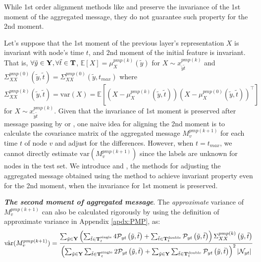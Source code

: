 While 1st order alignment methods like \PMP and \MMP preserve the invariance of the 1st moment of the aggregated message, they do not guarantee such property for the 2nd moment. 

Let's suppose that the 1st moment of the previous layer's representation $X$ is invariant with node's time $t$, and 2nd moment of the initial feature is invariant. That is, $\forall\tilde{y} \in\bold{Y}, \forall\tilde{t}\in\bold{T}$, $\mathbb{E}[X]=\mu_{X}^{pmp(k)}(\tilde{y})$ for $X\sim {x_{\tilde{y} \tilde{t}}^{pmp(k)}}$ and $\Sigma_{XX}^{pmp(0)}\left(\tilde{y},\tilde{t}\right)=
\Sigma_{XX}^{pmp(0)}\left(\tilde{y},t_{max}\right)$ where $\Sigma_{XX}^{pmp(k)}\left(\tilde{y},\tilde{t}\right)=
\text{var}({X})=\mathbb{E}\left[(X-\mu_{X}^{pmp(k)}\left(\tilde{y},\tilde{t}\right))(X-\mu_{X}^{pmp(0)}\left(\tilde{y},\tilde{t}\right))^{\top}\right]$ for $X\sim {x_{\tilde{y} \tilde{t}}^{pmp(k)}}$. Given that the invariance of 1st moment is preserved after message passing by \PMP or \MMP, one naive idea for aligning the 2nd moment is to calculate the covariance matrix of the aggregated message $M_{v}^{pmp(k+1)}$ for each time $t$ of node $v$ and adjust for the differences. However, when $t=t_{max}$, we cannot directly estimate $\text{var}(M_{v}^{pmp (k+1)})$ since the labels are unknown for nodes in the test set. We introduce \PNY and \JJnorm, the methods for adjusting the aggregated message obtained using the \PMP method to achieve invariant property even for the 2nd moment, when the invariance for 1st moment is preserved.

\textbf{\textit{The second moment of aggregated message}}. The \textit{approximate} variance of $M_{v}^{pmp(k+1)}$ can also be calculated rigorously by using the definition of approximate variance in Appendix \ref{apdx:PMP}, as:
\vspace{-4pt}
{\scriptsize
\begin{align}
\hat{\text{var}}(M_{v}^{pmp(k+1)}) = {\sum_{\tilde{y}\in \bold{Y}}\left(\sum_{\tilde{t}\in\bold{T}_{t}^{\text{single}}}4\mathcal{P}_{yt}\left(\tilde{y}, \tilde{t}\right)+\sum_{\tilde{t}\in\bold{T}_{t}^{\text{double}}}\mathcal{P}_{yt}\left(\tilde{y}, \tilde{t}\right)\right)\Sigma_{XX}^{pmp(k)}\left(\tilde{y},\tilde{t}\right)
\over
\left(\sum_{\tilde{y}\in \bold{Y}}\sum_{\tilde{t}\in\bold{T}_{t}^{\text{single}}}2\mathcal{P}_{yt}\left(\tilde{y}, \tilde{t}\right)+\sum_{\tilde{y}\in \bold{Y}}\sum_{\tilde{t}\in\bold{T}_{t}^{\text{double}}}\mathcal{P}_{yt}\left(\tilde{y}, \tilde{t}\right)\right)^2|\mathcal{N}_{yt}|}
\end{align}
}%

